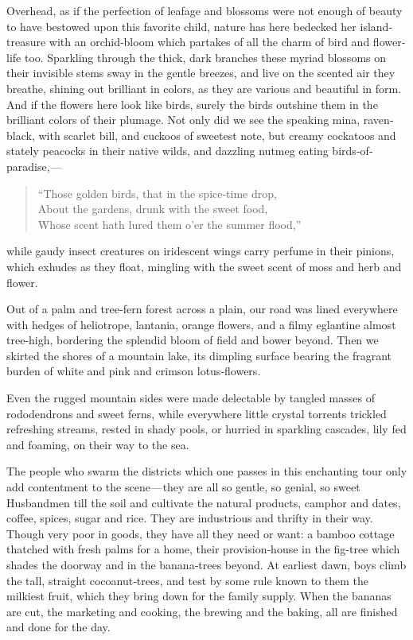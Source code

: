 \documentclass[12pt]{book}
\begin{document}
Overhead, as if the perfection of leafage and blossoms were not enough of
beauty to have bestowed upon this favorite child, nature has here bedecked her
island‐treasure with an orchid‐bloom which partakes of all the charm of bird
and flower‐life too. Sparkling through the thick, dark branches these myriad
blossoms on their invisible stems sway in the gentle breezes, and live on the
scented air they breathe, shining out brilliant in colors, as they are various and
beautiful in form. And if the flowers here look like birds, surely the birds outshine
them in the brilliant colors of their plumage. Not only did we see the speaking
mina, raven‐black, with scarlet bill, and cuckoos of sweetest note, but creamy
cockatoos and stately peacocks in their native wilds, and dazzling nutmeg eating
birds‐of‐paradise, —
\begin{quote}
“Those golden birds, that in the spice‐time drop, \\
About the gardens, drunk with the sweet food, \\
Whose scent hath lured them o’er the summer flood,”
\end{quote}
while gaudy insect creatures on iridescent wings carry perfume in their pinions, which exhudes as they float, mingling with the sweet scent of moss and
herb and flower.

Out of a palm and tree‐fern forest across a plain, our road was lined everywhere
with hedges of heliotrope, lantania, orange flowers, and a filmy eglantine almost
tree‐high, bordering the splendid bloom of field and bower beyond. Then we
skirted the shores of a mountain lake, its dimpling surface bearing the fragrant
burden of white and pink and crimson lotus‐flowers.

Even the rugged mountain sides were made delectable by tangled masses of
rododendrons and sweet ferns, while everywhere little crystal torrents trickled
refreshing streams, rested in shady pools, or hurried in sparkling cascades, lily
fed and foaming, on their way to the sea.

The people who swarm the districts which one passes in this enchanting
tour only add contentment to the scene — they are all so gentle, so genial, so
sweet Husbandmen till the soil and cultivate the natural products, camphor and
dates, coffee, spices, sugar and rice. They are industrious and thrifty in their way.
Though very poor in goods, they have all they need or want: a bamboo cottage
thatched with fresh palms for a home, their provision‐house in the fig‐tree which
shades the doorway and in the banana‐trees beyond. At earliest dawn, boys climb
the tall, straight cocoanut‐trees, and test by some rule known to them the milkiest
fruit, which they bring down for the family supply. When the bananas are cut,
the marketing and cooking, the brewing and the baking, all are finished and done
for the day.
\end{document}
